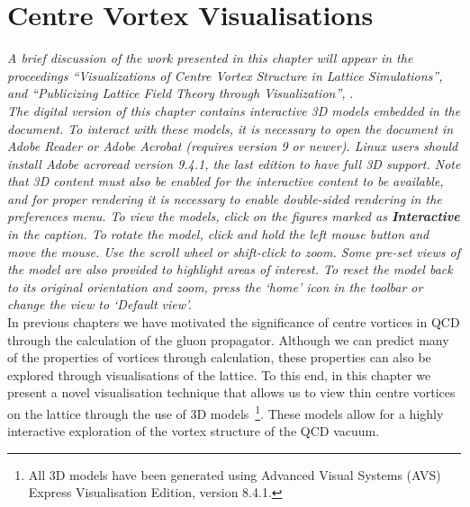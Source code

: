 
\chapter{Centre Vortex Visualisations}\label{chapter:Visualisations}
\ifpdf
    \graphicspath{{Chapter7/Figs/Raster/}{Chapter7/Figs/PDF/}{Chapter7/Figs/}}
\else
    \graphicspath{{Chapter7/Figs/Vector/}{Chapter7/Figs/}}
\fi
\textit{A brief discussion of the work presented in this chapter will appear in the proceedings ``Visualizations of Centre Vortex Structure in Lattice Simulations'', }\citet{Biddle:2018a} \textit{and ``Publicizing Lattice Field Theory through Visualization'', }\citet{Biddle:2018b}.\\

\textit{The digital version of this chapter contains interactive 3D models embedded in the document. To interact with these models, it is necessary to open the document in Adobe Reader or Adobe Acrobat (requires version 9 or newer). Linux users should install Adobe acroread version 9.4.1, the last edition to have full 3D support. Note that 3D content must also be enabled for the interactive content to be available, and for proper rendering it is necessary to enable double-sided rendering in the preferences menu. To view the models, click on the figures marked as \textbf{Interactive} in the caption. To rotate the model, click and hold the left mouse button and move the mouse. Use the scroll wheel or shift-click to zoom. Some pre-set views of the model are also provided to highlight areas of interest. To reset the model back to its original orientation and zoom, press the ‘home’ icon in the toolbar or change the view to ‘Default view’.}\\

In previous chapters we have motivated the significance of centre vortices in QCD through the calculation of the gluon propagator. Although we can predict many of the properties of vortices through calculation, these properties can also be explored through visualisations of the lattice. To this end, in this chapter we present a novel visualisation technique that allows us to view thin centre vortices on the lattice through the use of 3D models~\footnote{All 3D models have been generated using Advanced Visual Systems (AVS) Express Visualisation Edition, version 8.4.1.}. These models allow for a highly interactive exploration of the vortex structure of the QCD vacuum.

